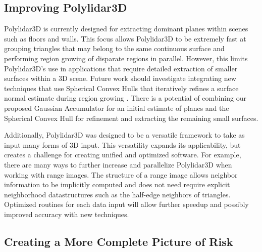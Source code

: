 \subsection{Improving Polylidar3D}

Polylidar3D is currently designed for extracting dominant planes within scenes such as floors and walls. This focus allows Polylidar3D to be extremely fast at grouping triangles that may belong to the same continuous surface and performing region growing of disparate regions in parallel. However, this limits Polylidar3D's use in applications that require detailed extraction of smaller surfaces within a 3D scene. Future work should investigate integrating new techniques that use Spherical Convex Hulls that iteratively refines a surface normal estimate during region growing \cite{mols_highly_2020}. There is a potential of combining our proposed Gaussian Accumulator for an initial estimate of planes and the Spherical Convex Hull for refinement and extracting the remaining small surfaces. 

Additionally, Polylidar3D was designed to be a versatile framework to take as input many forms of 3D input.  This versatility expands its applicability, but creates a challenge for creating unified and optimized software. For example, there are many ways to further increase and parallelize Polylidar3D when working with range images. The structure of a range image allows neighbor information to be implicitly computed and does not need require explicit neighborhood datastructures such as the half-edge neighbors of triangles. Optimized routines for each data input will allow further speedup and possibly improved accuracy with new techniques.


\subsection{Creating a More Complete Picture of Risk}

